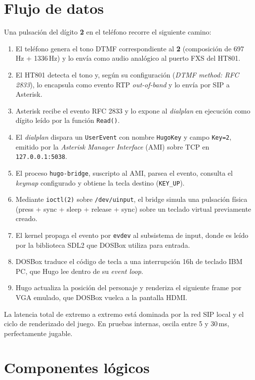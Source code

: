 \section{Flujo de datos}

Una pulsación del dígito \textbf{2} en el teléfono recorre el siguiente camino:

\begin{enumerate}
  \item El teléfono genera el tono DTMF correspondiente al \textbf{2} (composición de 697\,Hz + 1336\,Hz) y lo envía como audio analógico al puerto FXS del HT801.
  \item El HT801 detecta el tono y, según su configuración (\emph{DTMF method: RFC 2833}), lo encapsula como evento RTP \emph{out-of-band} y lo envía por SIP a Asterisk.
  \item Asterisk recibe el evento RFC 2833 y lo expone al \emph{dialplan} en ejecución como dígito leído por la función \texttt{Read()}.
  \item El \emph{dialplan} dispara un \texttt{UserEvent} con nombre \texttt{HugoKey} y campo \texttt{Key=2}, emitido por la \emph{Asterisk Manager Interface} (AMI) sobre TCP en \texttt{127.0.0.1:5038}.
  \item El proceso \texttt{hugo-bridge}, suscripto al AMI, parsea el evento, consulta el \emph{keymap} configurado y obtiene la tecla destino (\texttt{KEY\_UP}).
  \item Mediante \texttt{ioctl(2)} sobre \texttt{/dev/uinput}, el bridge simula una pulsación física (press + sync + sleep + release + sync) sobre un teclado virtual previamente creado.
  \item El kernel propaga el evento por \texttt{evdev} al subsistema de input, donde es leído por la biblioteca SDL2 que DOSBox utiliza para entrada.
  \item DOSBox traduce el código de tecla a una interrupción 16h de teclado IBM PC, que Hugo lee dentro de su \emph{event loop}.
  \item Hugo actualiza la posición del personaje y renderiza el siguiente frame por VGA emulado, que DOSBox vuelca a la pantalla HDMI.
\end{enumerate}

La latencia total de extremo a extremo está dominada por la red SIP local y el ciclo de renderizado del juego. En pruebas internas, oscila entre 5 y 30\,ms, perfectamente jugable.

\section{Componentes lógicos}

